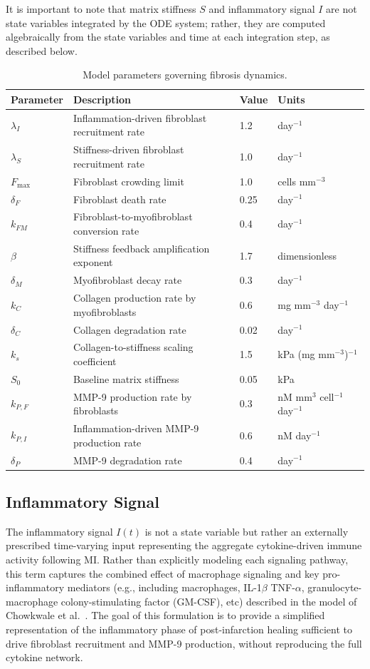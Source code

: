 \documentclass[Afour,sageh,times]{sagej}
\begin{document}
It is important to note that matrix stiffness $S$ and inflammatory signal $I$ are not state variables integrated by the ODE system; rather, they are computed algebraically from the state variables and time at each integration step, as described below.

\begin{table}[h]
\centering
\begin{tabularx}{\textwidth}{lXlX}
\toprule
\textbf{Parameter} & \textbf{Description} & \textbf{Value} & \textbf{Units}\\
\midrule
$\lambda_I$ & Inflammation-driven fibroblast recruitment rate & 1.2 & day$^{-1}$ \\
$\lambda_S$ & Stiffness-driven fibroblast recruitment rate & 1.0 & day$^{-1}$ \\
$F_\mathrm{max}$ & Fibroblast crowding limit & 1.0 & cells mm$^{-3}$ \\
$\delta_F$ & Fibroblast death rate & 0.25 & day$^{-1}$ \\
$k_{FM}$ & Fibroblast-to-myofibroblast conversion rate & 0.4 & day$^{-1}$ \\
$\beta$ & Stiffness feedback amplification exponent & 1.7 & dimensionless \\
$\delta_M$ & Myofibroblast decay rate & 0.3 & day$^{-1}$ \\
$k_C$ & Collagen production rate by myofibroblasts & 0.6 & mg mm$^{-3}$ day$^{-1}$ \\
$\delta_C$ & Collagen degradation rate & 0.02 & day$^{-1}$ \\
$k_s$ & Collagen-to-stiffness scaling coefficient & 1.5 & kPa (mg mm$^{-3}$)$^{-1}$ \\
$S_0$ & Baseline matrix stiffness & 0.05 & kPa \\
$k_{P,F}$ & MMP-9 production rate by fibroblasts & 0.3 & nM mm$^{3}$ cell$^{-1}$ day$^{-1}$ \\
$k_{P,I}$ & Inflammation-driven MMP-9 production rate & 0.6 & nM day$^{-1}$ \\
$\delta_P$ & MMP-9 degradation rate & 0.4 & day$^{-1}$ \\
\bottomrule
\end{tabularx}
\caption{Model parameters governing fibrosis dynamics.}
\label{tab:parameters}
\end{table}

\subsection{Inflammatory Signal}
The inflammatory signal $I(t)$ is not a state variable but rather an externally prescribed time-varying input representing the aggregate cytokine-driven immune activity following MI. Rather than explicitly modeling each signaling pathway, this term captures the combined effect of macrophage signaling and key pro-inflammatory mediators (e.g., including macrophages, IL-1$\beta$ TNF-$\alpha$, granulocyte-macrophage colony-stimulating factor (GM-CSF), etc) described in the model of Chowkwale et al.~\citep{chowkwale2023}. The goal of this formulation is to provide a simplified representation of the inflammatory phase of post-infarction healing sufficient to drive fibroblast recruitment and MMP-9 production, without reproducing the full cytokine network.
\end{document}
